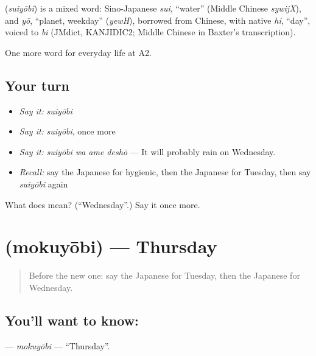 \begin{cousinweb}
\textbf{} (\emph{suiyōbi}) is a mixed word: Sino-Japanese \emph{sui}, \textquotedblleft{}water\textquotedblright{} (Middle Chinese \emph{sywijX}), and \emph{yō}, \textquotedblleft{}planet, weekday\textquotedblright{} (\emph{yewH}), borrowed from Chinese, with native \emph{hi}, \textquotedblleft{}day\textquotedblright{}, voiced to \emph{bi} (JMdict, KANJIDIC2; Middle Chinese in Baxter's transcription).
\end{cousinweb}

\begin{grammarlens}[title={What you've built}]
One more word for everyday life at A2.
\end{grammarlens}

\subsection*{Your turn}
\begin{itemize}
\raggedright
  \item \emph{Say it:} \emph{suiyōbi}
  \item \emph{Say it:} \emph{suiyōbi}, once more
  \item \emph{Say it:} \emph{suiyōbi wa ame deshō} — It will probably rain on Wednesday.
  \item \emph{Recall:} say the Japanese for hygienic, then the Japanese for Tuesday, then say \emph{suiyōbi} again
\end{itemize}

\begin{tcolorbox}[breakable,colback=teal!4,colframe=teal!35!black,title={Before you move on}]
What does  mean? (\textquotedblleft{}Wednesday\textquotedblright{}.) Say it once more.
\end{tcolorbox}
\section[\texorpdfstring{\ja{もくようび} (mokuyōbi)}{もくようび (mokuyōbi)}]{ (mokuyōbi) — Thursday}

\label{lesson:JA-C164-mokuyoubi}



\begin{quote}
Before the new one: say the Japanese for Tuesday, then the Japanese for Wednesday.
\end{quote}

\subsection*{You'll want to know: }
\textbf{} — \emph{mokuyōbi} — \textquotedblleft{}Thursday\textquotedblright{}.

